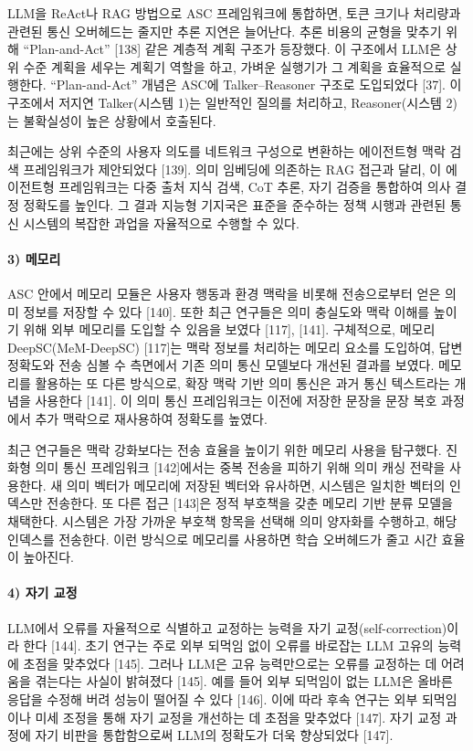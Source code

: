 LLM을 ReAct나 RAG 방법으로 ASC 프레임워크에 통합하면, 토큰 크기나 처리량과 관련된 통신 오버헤드는 줄지만 추론 지연은 늘어난다.
추론 비용의 균형을 맞추기 위해 ``Plan-and-Act'' [138] 같은 계층적 계획 구조가 등장했다.
이 구조에서 LLM은 상위 수준 계획을 세우는 계획기 역할을 하고, 가벼운 실행기가 그 계획을 효율적으로 실행한다.
``Plan-and-Act'' 개념은 ASC에 Talker--Reasoner 구조로 도입되었다 [37].
이 구조에서 저지연 Talker(시스템 1)는 일반적인 질의를 처리하고, Reasoner(시스템 2)는 불확실성이 높은 상황에서 호출된다.

최근에는 상위 수준의 사용자 의도를 네트워크 구성으로 변환하는 에이전트형 맥락 검색 프레임워크가 제안되었다 [139].
의미 임베딩에 의존하는 RAG 접근과 달리, 이 에이전트형 프레임워크는 다중 출처 지식 검색, CoT 추론, 자기 검증을 통합하여 의사 결정 정확도를 높인다.
그 결과 지능형 기지국은 표준을 준수하는 정책 시행과 관련된 통신 시스템의 복잡한 과업을 자율적으로 수행할 수 있다.

\paragraph{3) 메모리}
ASC 안에서 메모리 모듈은 사용자 행동과 환경 맥락을 비롯해 전송으로부터 얻은 의미 정보를 저장할 수 있다 [140].
또한 최근 연구들은 의미 충실도와 맥락 이해를 높이기 위해 외부 메모리를 도입할 수 있음을 보였다 [117], [141].
구체적으로, 메모리 DeepSC(MeM-DeepSC) [117]는 맥락 정보를 처리하는 메모리 요소를 도입하여, 답변 정확도와 전송 심볼 수 측면에서 기존 의미 통신 모델보다 개선된 결과를 보였다.
메모리를 활용하는 또 다른 방식으로, 확장 맥락 기반 의미 통신은 과거 통신 텍스트라는 개념을 사용한다 [141].
이 의미 통신 프레임워크는 이전에 저장한 문장을 문장 복호 과정에서 추가 맥락으로 재사용하여 정확도를 높였다.

최근 연구들은 맥락 강화보다는 전송 효율을 높이기 위한 메모리 사용을 탐구했다.
진화형 의미 통신 프레임워크 [142]에서는 중복 전송을 피하기 위해 의미 캐싱 전략을 사용한다.
새 의미 벡터가 메모리에 저장된 벡터와 유사하면, 시스템은 일치한 벡터의 인덱스만 전송한다.
또 다른 접근 [143]은 정적 부호책을 갖춘 메모리 기반 분류 모델을 채택한다.
시스템은 가장 가까운 부호책 항목을 선택해 의미 양자화를 수행하고, 해당 인덱스를 전송한다.
이런 방식으로 메모리를 사용하면 학습 오버헤드가 줄고 시간 효율이 높아진다.

\paragraph{4) 자기 교정}
LLM에서 오류를 자율적으로 식별하고 교정하는 능력을 자기 교정(self-correction)이라 한다 [144].
초기 연구는 주로 외부 되먹임 없이 오류를 바로잡는 LLM 고유의 능력에 초점을 맞추었다 [145].
그러나 LLM은 고유 능력만으로는 오류를 교정하는 데 어려움을 겪는다는 사실이 밝혀졌다 [145].
예를 들어 외부 되먹임이 없는 LLM은 올바른 응답을 수정해 버려 성능이 떨어질 수 있다 [146].
이에 따라 후속 연구는 외부 되먹임이나 미세 조정을 통해 자기 교정을 개선하는 데 초점을 맞추었다 [147].
자기 교정 과정에 자기 비판을 통합함으로써 LLM의 정확도가 더욱 향상되었다 [147].


